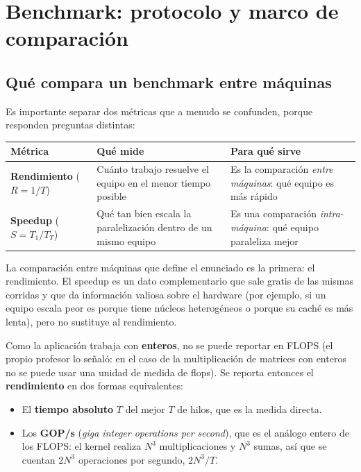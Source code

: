 \section{Benchmark: protocolo y marco de comparación}

\subsection{Qué compara un benchmark entre máquinas}

Es importante separar dos métricas que a menudo se confunden, porque responden preguntas distintas:

\begin{center}
\begin{tabular}{|l|p{6.2cm}|p{6.2cm}|}
\hline
\textbf{Métrica} & \textbf{Qué mide} & \textbf{Para qué sirve} \\
\hline
\textbf{Rendimiento} ($R = 1/T$) &
Cuánto trabajo resuelve el equipo en el menor tiempo posible &
Es la comparación \emph{entre máquinas}: qué equipo es más rápido \\
\hline
\textbf{Speedup} ($S = T_1/T_T$) &
Qué tan bien escala la paralelización dentro de un mismo equipo &
Es una comparación \emph{intra-máquina}: qué equipo paraleliza mejor \\
\hline
\end{tabular}
\end{center}

La comparación entre máquinas que define el enunciado es la primera: el rendimiento. El speedup es un dato complementario que sale gratis de las mismas corridas y que da información valiosa sobre el hardware (por ejemplo, si un equipo escala peor es porque tiene núcleos heterogéneos o porque su caché es más lenta), pero no sustituye al rendimiento.

Como la aplicación trabaja con \textbf{enteros}, no se puede reportar en FLOPS (el propio profesor lo señaló: en el caso de la multiplicación de matrices con enteros no se puede usar una unidad de medida de flops). Se reporta entonces el \textbf{rendimiento} en dos formas equivalentes:

\begin{itemize}
    \item El \textbf{tiempo absoluto} $T$ del mejor $T$ de hilos, que es la medida directa.
    \item Los \textbf{GOP/s} (\textit{giga integer operations per second}), que es el análogo entero de los FLOPS: el kernel realiza $N^3$ multiplicaciones y $N^3$ sumas, así que se cuentan $2N^3$ operaciones por segundo, $2N^3/T$.
\end{itemize}

